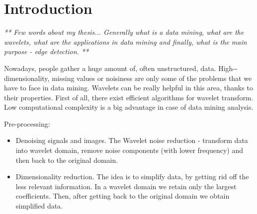 \chapter*{Introduction}

\textit{ ** Few words about my thesis...
Generally what is a data mining, what are the wavelets, what are the applications in data mining and finally, what is the main purpose - edge detection. **}

%	

Nowadays, people gather a huge amount of, often unstructured, data. High-\allowbreak-dimensionality, missing values or noisiness are only some of the problems that we have to face in data mining. Wavelets can be really helpful in this area, thanks to their properties. First of all, there exist efficient algorithms for wavelet transform. Low computational complexity is a big advantage in case of data mining analysis.


Pre-processing:
\begin{itemize}
\item Denoising signals and images. The Wavelet noise reduction - transform data into wavelet domain, remove noise components (with lower frequency) and then back to the original domain.

\item Dimensionality reduction. The idea is to simplify data, by getting rid off the less relevant information. In a wavelet domain we retain only the largest coefficients. Then, after getting back to the original domain we obtain simplified data.
\end{itemize}


